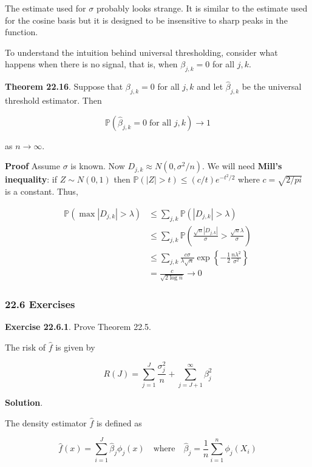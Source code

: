 The estimate used for \(\sigma\) probably looks strange. It is similar
to the estimate used for the cosine basis but it is designed to be
insensitive to sharp peaks in the function.

To understand the intuition behind universal thresholding, consider what
happens when there is no signal, that is, when \(\beta_{j, k} = 0\) for
all \(j, k\).

\textbf{Theorem 22.16}. Suppose that \(\beta_{j, k} = 0\) for all
\(j, k\) and let \(\hat{\beta}_{j, k}\) be the universal threshold
estimator. Then

\[ \mathbb{P}\left(\hat{\beta}_{j, k} = 0 \; \text{for all } j, k \right) \rightarrow 1 \]

as \(n \rightarrow \infty\).

\textbf{Proof} Assume \(\sigma\) is known. Now
\(D_{j, k} \approx N(0, \sigma^2 / n)\). We will need \textbf{Mill's
inequality}: if \(Z \sim N(0, 1)\) then
\(\mathbb{P}(|Z| > t) \leq (c / t) e^{-t^2 / 2}\) where
\(c = \sqrt{2 / pi}\) is a constant. Thus,

\[
\begin{align}
\mathbb{P}(\max |D_{j, k}| > \lambda) &\leq \sum_{j, k} \mathbb{P}(|D_{j, k}| > \lambda) \\
& \leq \sum_{j, k} \mathbb{P} \left( \frac{\sqrt{n} |D_{j, k}|}{\sigma} > \frac{\sqrt{n} \lambda}{\sigma} \right) \\
& \leq \sum_{j, k} \frac{c \sigma}{\lambda \sqrt{n}} \exp \left\{ - \frac{1}{2} \frac{n \lambda^2}{\sigma^2} \right\} \\
& = \frac{c}{\sqrt{2 \log n}} \rightarrow 0
\end{align}
\]

\subsubsection{22.6 Exercises}\label{exercises}

\textbf{Exercise 22.6.1}. Prove Theorem 22.5.

The risk of \(\hat{f}\) is given by

\[ R(J) = \sum_{j=1}^J \frac{\sigma_j^2}{n} + \sum_{j=J+1}^\infty \beta_j^2 \]

\textbf{Solution}.

The density estimator \(\hat{f}\) is defined as

\[ \hat{f}(x) = \sum_{i=1}^J \hat{\beta}_j \phi_j(x) 
\quad \text{where} \quad
\hat{\beta}_j = \frac{1}{n} \sum_{i=1}^n \phi_j(X_i)\]

